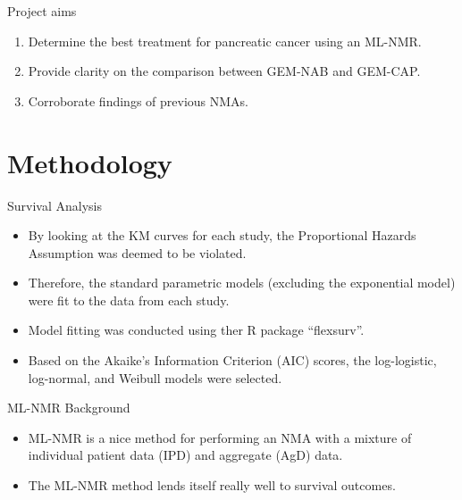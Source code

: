 \documentclass{beamer}
\begin{document}
\begin{frame}{Project aims}
    \begin{enumerate}
        \item Determine the best treatment for pancreatic cancer using an ML-NMR.
        \pause
        \item Provide clarity on the comparison between GEM-NAB and GEM-CAP.
        \pause
        \item Corroborate findings of previous NMAs.
    \end{enumerate} 
\end{frame} 

\section{Methodology}

\begin{frame}{Survival Analysis}
    \begin{itemize}
        \item By looking at the KM curves for each study, the Proportional Hazards Assumption was deemed to be violated.
        \pause
        \item Therefore, the standard parametric models (excluding the exponential model) were fit to the data from each study.
        \pause
        \item Model fitting was conducted using ther R package ``flexsurv''.
        \pause
        \item Based on the Akaike's Information Criterion (AIC) scores, the log-logistic, log-normal, and Weibull models were selected. 
    \end{itemize}   
\end{frame} 

\begin{frame}{ML-NMR Background}
    \begin{itemize}
        \item ML-NMR is a nice method for performing an NMA with a mixture of individual patient data (IPD) and aggregate (AgD) data. 
        \pause
        \item The ML-NMR method lends itself really well to survival outcomes.
    \end{itemize}
\end{frame}
\end{document}
